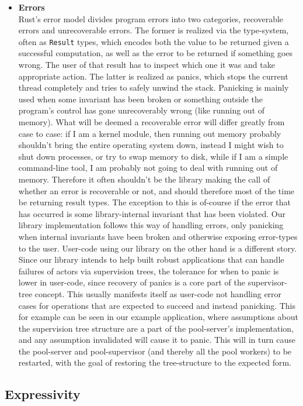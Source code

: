 \documentclass[a4paper]{article}
\begin{document}
\begin{itemize}
\item {\bf Errors} \\
Rust's error model divides program errors into two categories, recoverable errors
and unrecoverable errors. The former is realized via the type-system, often as
\texttt{Result} types, which encodes both the value to be returned given a
successful computation, as well as the error to be returned if something goes
wrong. The user of that result has to inspect which one it was and
take appropriate action. The latter is realized as panics, which stops the
current thread completely and tries to safely unwind the stack. Panicking is
mainly used when some invariant has been broken or something outside the
program's control has gone unrecoverably wrong (like running out of memory).
What will be deemed a recoverable error will differ greatly from case to case:
if I am a kernel module, then running out memory probably shouldn't bring the
entire operating system down, instead I might wish to shut down processes, or try
to swap memory to disk, while if I am a simple command-line tool, I am probably
not going to deal with running out of memory. Therefore it often shouldn't be
the library making the call of whether an error is recoverable or
not, and should therefore most of the time be returning result types.
The exception to this is of-course if the error that has occurred is some
library-internal invariant that has been violated. Our library implementation
follows this way of handling errors, only panicking when internal invariants
have been broken and otherwise exposing error-types to the user. User-code using
our library on the other hand is a different story. Since our library intends to
help built robust applications that can handle failures of actors via supervision
trees, the tolerance for when to panic is lower in user-code, since recovery of
panics is a core part of the supervisor-tree concept. This usually manifests
itself as user-code not handling error cases for operations that are expected to
succeed and instead panicking. This for example can be seen in our example
application, where assumptions about the supervision tree structure are a part of
the pool-server's implementation, and any assumption invalidated will cause it
to panic. This will in turn cause the pool-server and pool-supervisor (and
thereby all the pool workers) to be restarted, with the goal of restoring the
tree-structure to the expected form.

\end{itemize}

\subsection{Expressivity}
\end{document}
